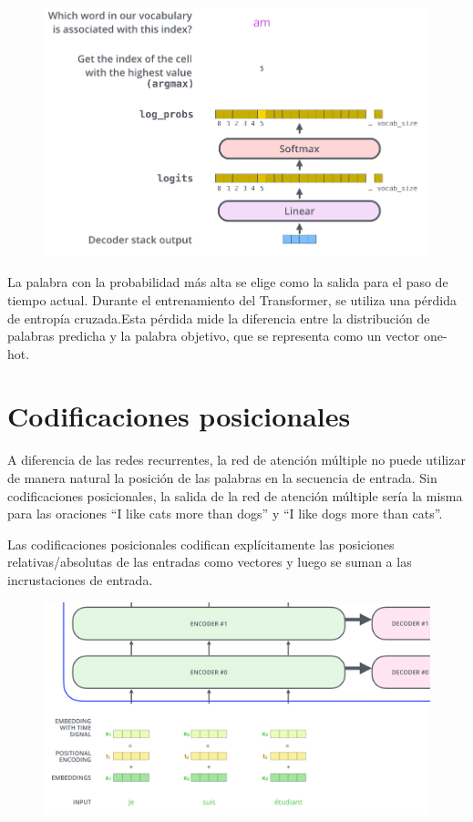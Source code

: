\begin{figure}[h]
  \centering
  \includegraphics[scale=0.2]{pics/transformer_decoder_output_softmax.png}
\end{figure}

La palabra con la probabilidad más alta se elige como la salida para el paso de tiempo actual. Durante el entrenamiento del Transformer, se utiliza una pérdida de entropía cruzada.Esta pérdida mide la diferencia entre la distribución de palabras predicha y la palabra objetivo, que se representa como un vector one-hot.



\section{Codificaciones posicionales}


A diferencia de las redes recurrentes, la red de atención múltiple no puede utilizar de manera natural la posición de las palabras en la secuencia de entrada. Sin codificaciones posicionales, la salida de la red de atención múltiple sería la misma para las oraciones ``I like cats more than dogs'' y ``I like dogs more than cats''.

Las codificaciones posicionales codifican explícitamente las posiciones relativas/absolutas de las entradas como vectores y luego se suman a las incrustaciones de entrada.

\begin{figure}[h]
  \centering
  \includegraphics[scale=0.2]{pics/transformer_positional_encoding_vectors.png}
\end{figure}

